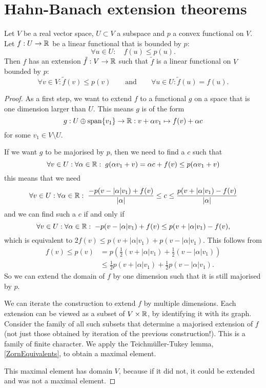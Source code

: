 \section{Hahn-Banach extension theorems}
\begin{theorem} \label{convexHahnBanach}
Let $V$ be a real vector space, $U\subset V$ a subspace and $p$ a convex functional on $V$. Let $f:U\to\mathbb{R}$ be a linear functional that is bounded by $p$:
\[ \forall u\in U: \quad f(u) \leq p(u). \]
Then $f$ has an extension $\tilde{f}: V\to \mathbb{R}$ such that $\tilde{f}$ is a linear functional on $V$ bounded by $p$:
\[ \forall v\in V: \tilde{f}(v) \leq p(v) \qquad \text{and} \qquad \forall u\in U: \tilde{f}(u) = f(u). \]
\end{theorem}
\begin{proof}
As a first step, we want to extend $f$ to a functional $g$ on a space that is one dimension larger than $U$. This means $g$ is of the form
\[ g: U\oplus\operatorname{span}\{v_1\}\to\mathbb{R}: v + \alpha v_1 \mapsto f(v) + \alpha c \]
for some $v_1\in V\setminus U$.

If we want $g$ to be majorised by $p$, then we need to find a $c$ such that
\[ \forall v\in U: \forall \alpha\in\mathbb{R}: \; g(\alpha v_1 + v) = \alpha c + f(v) \leq p(\alpha v_1 + v) \]
this means that we need
\[ \forall v\in U: \forall \alpha\in\mathbb{R}:\; \frac{-p(v - |\alpha|v_1) + f(v)}{|\alpha|} \leq c \leq \frac{p(v + |\alpha|v_1) - f(v)}{|\alpha|} \]
and we can find such a $c$ if and only if
\[ \forall v\in U: \forall \alpha\in\mathbb{R}:\; -p(v - |\alpha|v_1) + f(v) \leq p(v + |\alpha|v_1) - f(v), \]
which is equivalent to $2f(v) \leq p(v+|\alpha|v_1)+p(v-|\alpha|v_1)$. This follows from
\begin{align*}
f(v) \leq p(v) &= p(\tfrac{1}{2}(v+|\alpha|v_1) + \tfrac{1}{2}(v-|\alpha|v_1)) \\
&\leq \tfrac{1}{2}p(v+|\alpha|v_1) + \tfrac{1}{2}p(v-|\alpha|v_1).
\end{align*}
So we can extend the domain of $f$ by one dimension such that it is still majorised by $p$.

We can iterate the construction to extend $f$ by multiple dimensions. Each extension can be viewed as a subset of $V\times \mathbb{R}$, by identifying it with its graph.
Consider the family of all such subsets that determine a majorised extension of $f$ (not just those obtained by iteration of the previous construction!). This is a family of finite character. We apply the Teichmüller-Tukey lemma, \ref{ZornEquivalents}, to obtain a maximal element.

This maximal element has domain $V$, because if it did not, it could be extended and was not a maximal element.
\end{proof}
